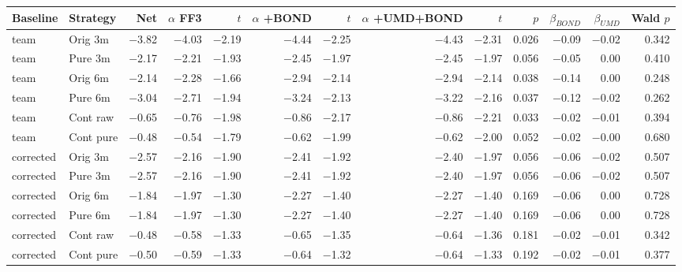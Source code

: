 \begin{tabular}{llrrrrrrrrrrr}
\toprule
Baseline & Strategy & Net & $\alpha$ FF3 & $t$ & $\alpha$ +BOND & $t$ & $\alpha$ +UMD+BOND & $t$ & $p$ & $\beta_{BOND}$ & $\beta_{UMD}$ & Wald $p$ \\
\midrule
team & Orig 3m & $-$3.82 & $-$4.03 & $-$2.19 & $-$4.44 & $-$2.25 & $-$4.43 & $-$2.31 & 0.026 & $-$0.09 & $-$0.02 & 0.342 \\
team & Pure 3m & $-$2.17 & $-$2.21 & $-$1.93 & $-$2.45 & $-$1.97 & $-$2.45 & $-$1.97 & 0.056 & $-$0.05 & 0.00 & 0.410 \\
team & Orig 6m & $-$2.14 & $-$2.28 & $-$1.66 & $-$2.94 & $-$2.14 & $-$2.94 & $-$2.14 & 0.038 & $-$0.14 & 0.00 & 0.248 \\
team & Pure 6m & $-$3.04 & $-$2.71 & $-$1.94 & $-$3.24 & $-$2.13 & $-$3.22 & $-$2.16 & 0.037 & $-$0.12 & $-$0.02 & 0.262 \\
team & Cont raw & $-$0.65 & $-$0.76 & $-$1.98 & $-$0.86 & $-$2.17 & $-$0.86 & $-$2.21 & 0.033 & $-$0.02 & $-$0.01 & 0.394 \\
team & Cont pure & $-$0.48 & $-$0.54 & $-$1.79 & $-$0.62 & $-$1.99 & $-$0.62 & $-$2.00 & 0.052 & $-$0.02 & $-$0.00 & 0.680 \\
corrected & Orig 3m & $-$2.57 & $-$2.16 & $-$1.90 & $-$2.41 & $-$1.92 & $-$2.40 & $-$1.97 & 0.056 & $-$0.06 & $-$0.02 & 0.507 \\
corrected & Pure 3m & $-$2.57 & $-$2.16 & $-$1.90 & $-$2.41 & $-$1.92 & $-$2.40 & $-$1.97 & 0.056 & $-$0.06 & $-$0.02 & 0.507 \\
corrected & Orig 6m & $-$1.84 & $-$1.97 & $-$1.30 & $-$2.27 & $-$1.40 & $-$2.27 & $-$1.40 & 0.169 & $-$0.06 & 0.00 & 0.728 \\
corrected & Pure 6m & $-$1.84 & $-$1.97 & $-$1.30 & $-$2.27 & $-$1.40 & $-$2.27 & $-$1.40 & 0.169 & $-$0.06 & 0.00 & 0.728 \\
corrected & Cont raw & $-$0.48 & $-$0.58 & $-$1.33 & $-$0.65 & $-$1.35 & $-$0.64 & $-$1.36 & 0.181 & $-$0.02 & $-$0.01 & 0.342 \\
corrected & Cont pure & $-$0.50 & $-$0.59 & $-$1.33 & $-$0.64 & $-$1.32 & $-$0.64 & $-$1.33 & 0.192 & $-$0.02 & $-$0.01 & 0.377 \\
\bottomrule
\end{tabular}
